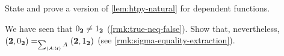 \begin{ex}\label{ex:dep-htpy-natural}
  State and prove a version of \cref{lem:htpy-natural} for dependent functions.
\end{ex}

\begin{ex}\label{ex:sigma-eq-components-neq}
  We have seen that ${0_{\mathbf{2}}} \neq {1_{\ensuremath{\mathbf{2}}}}$ (\cref{rmk:true-neq-false}). Show that, nevertheless, $(\bool, \bfalse) =_{\sm{A:\type}A} (\bool, \btrue)$ (see \cref{rmk:sigma-equality-extraction}).
\end{ex}

